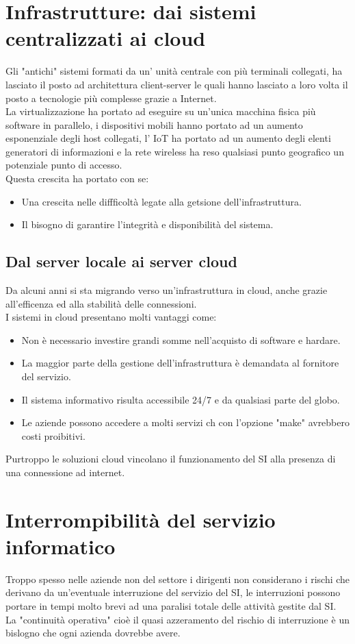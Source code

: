 \documentclass[../main.tex]{subfiles}
\begin{document}
	\section{Infrastrutture: dai sistemi centralizzati ai cloud}
	Gli "antichi" sistemi formati da un' unità centrale con più terminali collegati, ha lasciato il posto ad architettura client-server le quali hanno lasciato a loro volta il posto a tecnologie più complesse grazie a Internet.\\
	La virtualizzazione ha portato ad eseguire su un'unica macchina fisica più software in parallelo, i dispositivi mobili hanno portato ad un aumento esponenziale degli host collegati, l' IoT ha portato ad un aumento degli elenti generatori di informazioni e la rete wireless ha reso qualsiasi punto geografico un potenziale punto di accesso.\\
	Questa crescita ha portato con se:
	\begin{itemize}
		\item Una crescita nelle diffficoltà legate alla getsione dell'infrastruttura.
		\item Il bisogno di garantire l'integrità e disponibilità del sistema.
	\end{itemize}

	\subsection{Dal server locale ai server cloud}
	Da alcuni anni si sta migrando verso un'infrastruttura in cloud, anche grazie all'efficenza ed alla stabilità delle connessioni.\\
	I sistemi in cloud presentano molti vantaggi come:
	\begin{itemize}
		\item Non è necessario investire grandi somme nell'acquisto di software e hardare.
		\item La maggior parte della gestione dell'infrastruttura è demandata al fornitore del servizio.
		\item Il sistema informativo risulta accessibile 24/7 e da qualsiasi parte del globo.
		\item Le aziende possono accedere a molti servizi ch con l'opzione "make" avrebbero costi proibitivi.
	\end{itemize}
	Purtroppo le soluzioni cloud vincolano il funzionamento del SI alla presenza di una connessione ad internet.

	\section{Interrompibilità del servizio informatico}
	Troppo spesso nelle aziende non del settore i dirigenti non considerano i rischi che derivano da un'eventuale interruzione del servizio del SI, le interruzioni possono portare in tempi molto brevi ad una paralisi totale delle attività gestite dal SI.\\
	La "continuità operativa" cioè il quasi azzeramento del rischio di interruzione è un bislogno che ogni azienda dovrebbe avere.
\end{document}

